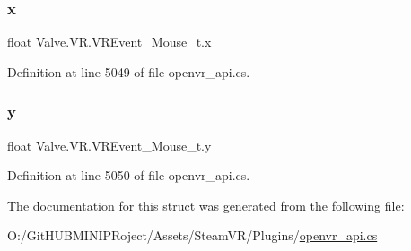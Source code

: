 \mbox{\label{struct_valve_1_1_v_r_1_1_v_r_event___mouse__t_a0ae7a397a8afdd916e32ae514757c4f8}} 
\subsubsection{\texorpdfstring{x}{x}}
{\footnotesize\ttfamily float Valve.\+V\+R.\+V\+R\+Event\+\_\+\+Mouse\+\_\+t.\+x}



Definition at line 5049 of file openvr\+\_\+api.\+cs.

\mbox{\label{struct_valve_1_1_v_r_1_1_v_r_event___mouse__t_acca7abe627d56fa8b2dc3e67cc5511d4}} 
\subsubsection{\texorpdfstring{y}{y}}
{\footnotesize\ttfamily float Valve.\+V\+R.\+V\+R\+Event\+\_\+\+Mouse\+\_\+t.\+y}



Definition at line 5050 of file openvr\+\_\+api.\+cs.



The documentation for this struct was generated from the following file\+:\begin{DoxyCompactItemize}
\item 
O\+:/\+Git\+H\+U\+B\+M\+I\+N\+I\+P\+Roject/\+Assets/\+Steam\+V\+R/\+Plugins/\mbox{\hyperlink{openvr__api_8cs}{openvr\+\_\+api.\+cs}}\end{DoxyCompactItemize}
